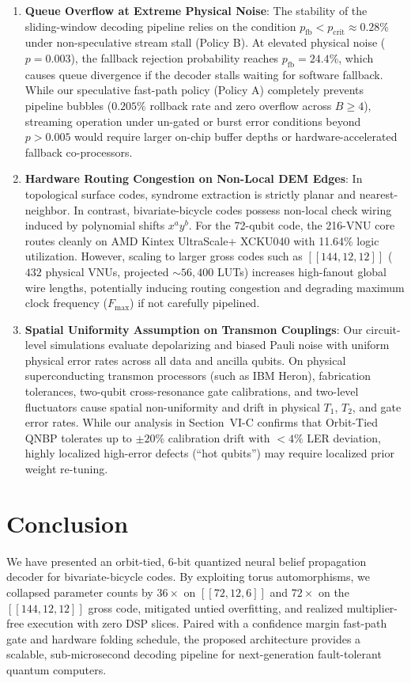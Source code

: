 \documentclass[journal]{IEEEtran}
\begin{document}
\begin{enumerate}
    \item \textbf{Queue Overflow at Extreme Physical Noise}: The stability of the sliding-window decoding pipeline relies on the condition $p_{\text{fb}} < p_{\text{crit}} \approx 0.28\%$ under non-speculative stream stall (Policy B). At elevated physical noise ($p = 0.003$), the fallback rejection probability reaches $p_{\text{fb}} = 24.4\%$, which causes queue divergence if the decoder stalls waiting for software fallback. While our speculative fast-path policy (Policy A) completely prevents pipeline bubbles ($0.205\%$ rollback rate and zero overflow across $B \ge 4$), streaming operation under un-gated or burst error conditions beyond $p > 0.005$ would require larger on-chip buffer depths or hardware-accelerated fallback co-processors.
    \item \textbf{Hardware Routing Congestion on Non-Local DEM Edges}: In topological surface codes, syndrome extraction is strictly planar and nearest-neighbor. In contrast, bivariate-bicycle codes possess non-local check wiring induced by polynomial shifts $x^a y^b$. For the 72-qubit code, the 216-VNU core routes cleanly on AMD Kintex UltraScale+ XCKU040 with 11.64\% logic utilization. However, scaling to larger gross codes such as $[[144, 12, 12]]$ ($432$ physical VNUs, projected $\sim 56,400$ LUTs) increases high-fanout global wire lengths, potentially inducing routing congestion and degrading maximum clock frequency ($F_{\max}$) if not carefully pipelined.
    \item \textbf{Spatial Uniformity Assumption on Transmon Couplings}: Our circuit-level simulations evaluate depolarizing and biased Pauli noise with uniform physical error rates across all data and ancilla qubits. On physical superconducting transmon processors (such as IBM Heron), fabrication tolerances, two-qubit cross-resonance gate calibrations, and two-level fluctuators cause spatial non-uniformity and drift in physical $T_1$, $T_2$, and gate error rates. While our analysis in Section~VI-C confirms that Orbit-Tied QNBP tolerates up to $\pm 20\%$ calibration drift with $<4\%$ LER deviation, highly localized high-error defects (``hot qubits'') may require localized prior weight re-tuning.
\end{enumerate}

\section{Conclusion}
We have presented an orbit-tied, 6-bit quantized neural belief propagation decoder for bivariate-bicycle codes. By exploiting torus automorphisms, we collapsed parameter counts by $36\times$ on $[[72,12,6]]$ and $72\times$ on the $[[144,12,12]]$ gross code, mitigated untied overfitting, and realized multiplier-free execution with zero DSP slices. Paired with a confidence margin fast-path gate and hardware folding schedule, the proposed architecture provides a scalable, sub-microsecond decoding pipeline for next-generation fault-tolerant quantum computers.
\end{document}
